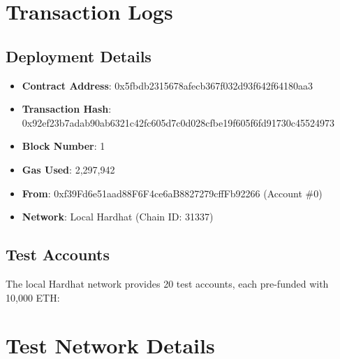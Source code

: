 \documentclass{article}
\begin{document}
\section{Transaction Logs}

\subsection{Deployment Details}
\begin{itemize}
    \item \textbf{Contract Address}: 0x5fbdb2315678afecb367f032d93f642f64180aa3
    \item \textbf{Transaction Hash}: 0x92ef23b7adab90ab6321c42fc605d7c0d028cfbe19f605f6fd91730c45524973
    \item \textbf{Block Number}: 1
    \item \textbf{Gas Used}: 2,297,942
    \item \textbf{From}: 0xf39Fd6e51aad88F6F4ce6aB8827279cffFb92266 (Account \#0)
    \item \textbf{Network}: Local Hardhat (Chain ID: 31337)
\end{itemize}

\subsection{Test Accounts}
The local Hardhat network provides 20 test accounts, each pre-funded with 10,000 ETH:

\section{Test Network Details}
\end{document}
